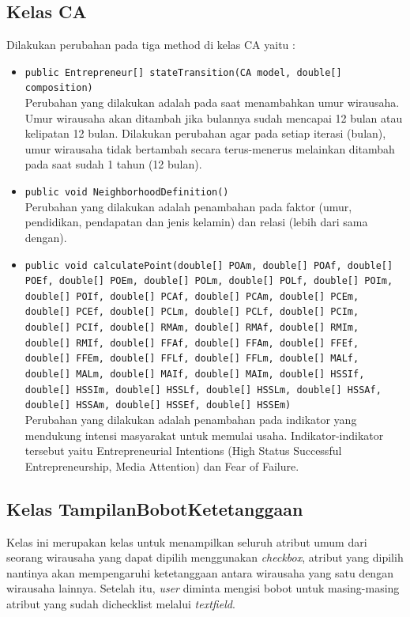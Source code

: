 \subsection{Kelas CA}
Dilakukan perubahan pada tiga method di kelas CA yaitu :
\begin{itemize}
	\item \texttt{public Entrepreneur[] stateTransition(CA model, double[] composition)}\\
	Perubahan yang dilakukan adalah pada saat menambahkan umur wirausaha. Umur wirausaha akan ditambah jika bulannya sudah mencapai 12 bulan atau kelipatan 12 bulan. Dilakukan perubahan agar pada setiap iterasi (bulan), umur wirausaha tidak bertambah secara terus-menerus melainkan ditambah pada saat sudah 1 tahun (12 bulan).
	\item \texttt{public void NeighborhoodDefinition() }\\
	Perubahan yang dilakukan adalah penambahan pada faktor (umur, pendidikan, pendapatan dan jenis kelamin) dan relasi (lebih dari sama dengan).
	\item \texttt{public void calculatePoint(double[] POAm, double[] POAf, double[] POEf, double[] POEm, double[] POLm, double[] POLf, double[] POIm, double[] POIf, double[] PCAf, double[] PCAm, double[] PCEm, double[] PCEf, double[] PCLm, double[] PCLf, double[] PCIm, double[] PCIf, double[] RMAm, double[] RMAf, double[] RMIm, double[] RMIf, double[] FFAf, double[] FFAm, double[] FFEf, double[] FFEm, double[] FFLf, double[] FFLm, double[] MALf, double[] MALm, double[] MAIf, double[] MAIm, double[] HSSIf, double[] HSSIm, double[] HSSLf, double[] HSSLm, double[] HSSAf, double[] HSSAm, double[] HSSEf, double[] HSSEm)}\\
	Perubahan yang dilakukan adalah penambahan pada indikator yang mendukung intensi masyarakat untuk memulai usaha. Indikator-indikator tersebut yaitu Entrepreneurial Intentions (High Status Successful Entrepreneurship, Media Attention) dan Fear of Failure.
\end{itemize}



\subsection{Kelas TampilanBobotKetetanggaan}
Kelas ini merupakan kelas untuk menampilkan seluruh atribut umum dari seorang wirausaha yang dapat dipilih menggunakan \textit{checkbox}, atribut yang dipilih nantinya akan mempengaruhi ketetanggaan antara wirausaha yang satu dengan wirausaha lainnya. Setelah itu, \textit{user} diminta mengisi bobot untuk masing-masing atribut yang sudah dichecklist melalui \textit{textfield}.

